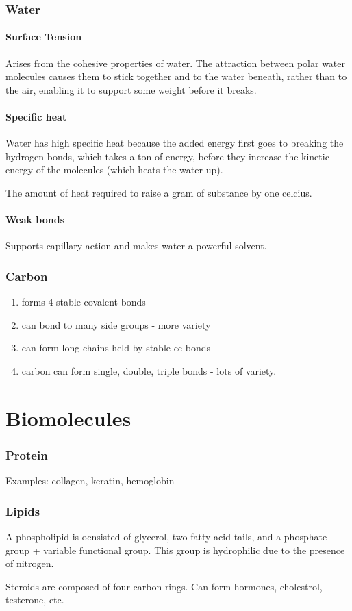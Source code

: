\documentclass[12pt]{article}
\begin{document}
\section{Water}
\subsection{Surface Tension}
Arises from the cohesive properties of water. The attraction between 
polar water molecules causes them to stick together and to the water beneath, 
rather than to the air, enabling it to support some weight before
it breaks. 
\subsection{Specific heat}
Water has high specific heat because the added energy first goes to 
breaking the hydrogen bonds, which takes a ton of energy,
before they increase the kinetic energy of the
molecules (which heats the water up). 
\begin{definition}
    The amount of heat required to raise a gram of substance by one celcius. 
\end{definition}
\subsection{Weak bonds}
Supports capillary action and makes water a powerful solvent. 

\section{Carbon}
\begin{enumerate}
    \item forms 4 stable covalent bonds
    \item can bond to many side groups - more variety
    \item can form long chains held by stable cc bonds
    \item carbon can form single, double, triple bonds - lots of variety.
\end{enumerate}

\part{Biomolecules}
\section{Protein}
Examples: collagen, keratin, hemoglobin

\section{Lipids}
A phospholipid is ocnsisted of glycerol, two fatty acid tails, and a phosphate group
+ variable functional group. This group is hydrophilic due to the 
presence of nitrogen. 

Steroids are composed of four carbon rings. Can form hormones, cholestrol, testerone, 
etc.
\end{document}
